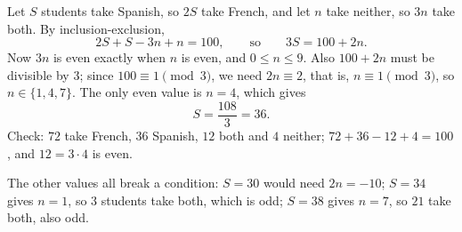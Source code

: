 Let $S$ students take Spanish, so $2S$ take French, and let $n$ take neither, so $3n$ take both. By inclusion-exclusion,
\[2S+S-3n+n=100,\qquad\text{so}\qquad 3S=100+2n .\]
Now $3n$ is even exactly when $n$ is even, and $0\le n\le9$. Also $100+2n$ must be divisible by $3$; since $100\equiv1\pmod3$, we need $2n\equiv2$, that is, $n\equiv1\pmod3$, so $n\in\{1,4,7\}$. The only even value is $n=4$, which gives
\[S=\dfrac{108}{3}=\boxed{36}.\]
Check: $72$ take French, $36$ Spanish, $12$ both and $4$ neither; $72+36-12+4=100$, and $12=3\cdot4$ is even.

The other values all break a condition: $S=30$ would need $2n=-10$; $S=34$ gives $n=1$, so $3$ students take both, which is odd; $S=38$ gives $n=7$, so $21$ take both, also odd.
